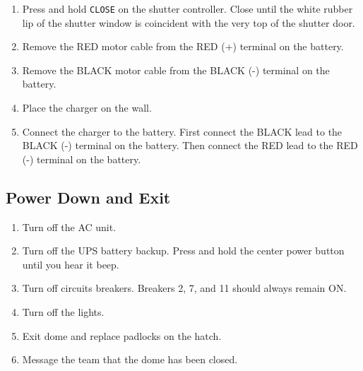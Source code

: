 \documentclass{article}
\begin{document}
		\begin{enumerate}
			
			\item Press and hold \texttt{CLOSE} on the shutter controller. Close until the white rubber lip of the shutter window is coincident with the very top of the shutter door.
			
			\item Remove the RED motor cable from the RED (+) terminal on the battery.
			
			\item Remove the BLACK motor cable from the BLACK (-) terminal on the battery.
			
			\item Place the charger on the wall.
			
			\item Connect the charger to the battery. First connect the BLACK lead to the BLACK (-) terminal on the battery. Then connect the RED lead to the RED (-) terminal on the battery.
			
		\end{enumerate}
		
	\subsection{Power Down and Exit}
	
		\begin{enumerate}
	
			\item Turn off the AC unit.
		
			\item Turn off the UPS battery backup. Press and hold the center power button until you hear it beep.
		
			\item Turn off circuits breakers. Breakers 2, 7, and 11 should always remain ON.
		
			\item Turn off the lights.
		
			\item Exit dome and replace padlocks on the hatch.
		
			\item Message the team that the dome has been closed.
		
		\end{enumerate}
	
\end{document}
